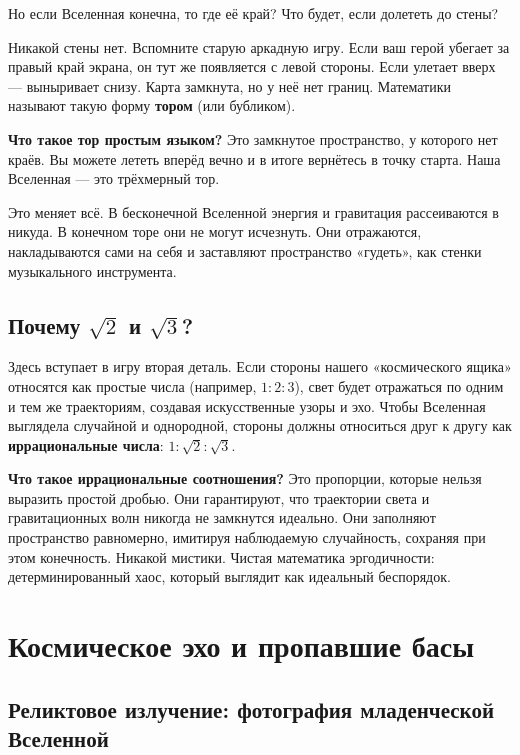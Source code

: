 \documentclass[12pt,a4paper,oneside]{book}
\begin{document}
Но если Вселенная конечна, то где её край? Что будет, если долететь до стены?

Никакой стены нет. Вспомните старую аркадную игру. Если ваш герой убегает за правый край экрана, он тут же появляется с левой стороны. Если улетает вверх — выныривает снизу. Карта замкнута, но у неё нет границ. Математики называют такую форму \textbf{тором} (или бубликом).

\textbf{Что такое тор простым языком?} Это замкнутое пространство, у которого нет краёв. Вы можете лететь вперёд вечно и в итоге вернётесь в точку старта. Наша Вселенная — это трёхмерный тор.

Это меняет всё. В бесконечной Вселенной энергия и гравитация рассеиваются в никуда. В конечном торе они не могут исчезнуть. Они отражаются, накладываются сами на себя и заставляют пространство «гудеть», как стенки музыкального инструмента.

\section{Почему \texorpdfstring{$\sqrt{2}$ и $\sqrt{3}$}{корень из 2 и корень из 3}?}

Здесь вступает в игру вторая деталь. Если стороны нашего «космического ящика» относятся как простые числа (например, $1:2:3$), свет будет отражаться по одним и тем же траекториям, создавая искусственные узоры и эхо. Чтобы Вселенная выглядела случайной и однородной, стороны должны относиться друг к другу как \textbf{иррациональные числа}: $1 : \sqrt{2} : \sqrt{3}$.

\textbf{Что такое иррациональные соотношения?} Это пропорции, которые нельзя выразить простой дробью. Они гарантируют, что траектории света и гравитационных волн никогда не замкнутся идеально. Они заполняют пространство равномерно, имитируя наблюдаемую случайность, сохраняя при этом конечность. Никакой мистики. Чистая математика эргодичности: детерминированный хаос, который выглядит как идеальный беспорядок.

\chapter{Космическое эхо и пропавшие басы}

\section{Реликтовое излучение: фотография младенческой Вселенной}
\end{document}
